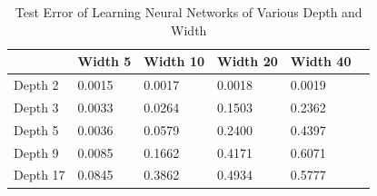 \begin{table}[h!]
\vskip 0.1in
\begin{center}
\begin{small}
\begin{sc}
\begin{tabular}{
  |p{}|%
   |p{}%
  |p{}%
  |p{}%
  |p{}%
   |p{}%
  }
   \hline 
           & Width 5   &  Width 10   & Width 20 & Width 40     \\ \hline 
    Depth 2 & 0.0015   & 0.0017      &   0.0018 & 0.0019 \\ \hline
    Depth 3 & 0.0033   & 0.0264        &   0.1503 & 0.2362 \\ \hline
    Depth 5 & 0.0036   & 0.0579        &   0.2400 & 0.4397 \\ \hline
    Depth 9 & 0.0085   & 0.1662        &   0.4171 & 0.6071 \\ \hline
    Depth 17 & 0.0845   & 0.3862        &   0.4934 & 0.5777 \\ \hline
\end{tabular}
\end{sc}
\end{small}
\end{center}
\caption{Test Error of Learning Neural Networks of Various Depth and Width}
\vskip -0.1in
\end{table}





